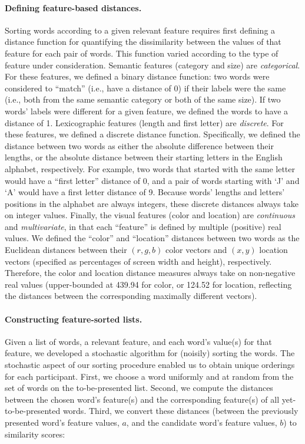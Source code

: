 \documentclass[11pt]{article}
\begin{document}
\paragraph{Defining feature-based distances.} Sorting words according to a
given relevant feature requires first defining a distance function for
quantifying the dissimilarity between the values of that feature for each pair of words. This function
varied according to the type of feature under consideration. Semantic features
(category and size) are \textit{categorical}. For these features, we defined a
binary distance function: two words were considered to ``match'' (i.e., have a
distance of 0) if their labels were the same (i.e., both from the same semantic
category or both of the same size). If two words' labels were different for a
given feature, we defined the words to have a distance of 1.
Lexicographic features (length and first letter) are \textit{discrete}. For
these features, we defined a discrete distance function. Specifically, we
defined the distance between two words as either the absolute difference
between their lengths, or the absolute distance between their starting letters
in the English alphabet, respectively. For example, two words that started with
the same letter would have a ``first letter'' distance of 0, and a pair of
words starting with `J' and `A' would have a first letter distance of 9.
Because words' lengths and letters' positions in the alphabet are always
integers, these discrete distances always take on integer values. Finally, the
visual features (color and location) are \textit{continuous} and
\textit{multivariate}, in that each ``feature'' is defined by multiple
(positive) real values. We defined the ``color'' and ``location'' distances
between two words as the Euclidean distances between their $(r, g, b)$ color vectors and
$(x, y)$ location vectors (specified as percentages of screen width and height), respectively. Therefore, the
color and location distance measures always take on non-negative real values
(upper-bounded at 439.94 for color, or 124.52 for location, reflecting the
distances between the corresponding maximally different vectors).

\paragraph{Constructing feature-sorted lists.} Given a list of words, a
relevant feature, and each word's value(s) for that feature, we developed a
stochastic algorithm for (noisily) sorting the words. The stochastic aspect of
our sorting procedure enabled us to obtain unique orderings for each
participant. First, we choose a word uniformly and at random from the set of
words on the to-be-presented list. Second, we compute the distances between the
chosen word's feature(s) and the corresponding feature(s) of all
yet-to-be-presented words. Third, we convert these distances (between the
previously presented word's feature values, $a$, and the candidate word's
feature values, $b$) to similarity scores:
\end{document}
